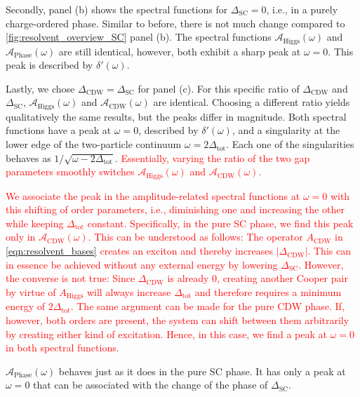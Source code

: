 \documentclass[
    reprint, 
    aps,
    preprintnumbers,
    twocolumn,
    prb,
    superscriptaddress
]{revtex4-2}
\newcommand{\spectral}[1]{\mathcal{A}_\text{#1}  (\omega)}
\newcommand{\markEdited}{red}
\begin{document}
Secondly, panel (b) shows the spectral functions for $\Delta_\text{SC} = 0$, i.e., in a purely charge-ordered phase.
Similar to before, there is not much change compared to \autoref{fig:resolvent_overview_SC} panel (b).
The spectral functions $\spectral{Higgs}$ and $\spectral{Phase}$ are still identical, however, both exhibit a sharp peak at $\omega=0$.
This peak is described by $\delta'(\omega)$.

Lastly, we chose $\Delta_\text{CDW} = \Delta_\text{SC}$ for panel (c).
For this specific ratio of $\Delta_\text{CDW}$ and $\Delta_\text{SC}$, $\spectral{Higgs}$ and $\spectral{CDW}$ are identical.
Choosing a different ratio yields qualitatively the same results, but the peaks differ in magnitude.
Both spectral functions have a peak at $\omega = 0$, described by $\delta'(\omega)$, and a singularity at the lower edge of the two-particle continuum $\omega = 2\Delta_\text{tot}$.
Each one of the singularities behaves as $1/\sqrt{\omega - 2 \Delta_\text{tot}}$.
\textcolor{\markEdited}{Essentially, varying the ratio of the two gap parameters smoothly switches $\spectral{Higgs}$ and $\spectral{CDW}$.}

\textcolor{\markEdited}{We associate the peak in the amplitude-related spectral functions at $\omega=0$ with this shifting of order parameters, i.e., diminishing one and increasing the other while keeping $\Delta_\text{tot}$ constant.
Specifically, in the pure SC phase, we find this peak only in $\spectral{CDW}$.
This can be understood as follows: The operator $A_\text{CDW}$ in \eqref{eqn:resolvent_bases} creates an exciton and thereby increases $|\Delta_\text{CDW}|$.
This can in essence be achieved without any external energy by lowering $\Delta_\text{SC}$.
However, the converse is not true: Since $\Delta_\text{CDW}$ is already 0, creating another Cooper pair by virtue of $A_\text{Higgs}$ will always increase $\Delta_\text{tot}$ and therefore requires a minimum energy of $2 \Delta_\text{tot}$.
The same argument can be made for the pure CDW phase.
If, however, both orders are present, the system can shift between them arbitrarily by creating either kind of excitation.
Hence, in this case, we find a peak at $\omega=0$ in both spectral functions.}

$\spectral{Phase}$ behaves just as it does in the pure SC phase. It has only a peak at $\omega = 0$ that can be associated with the change of the phase of $\Delta_\text{SC}$.

\end{document}
